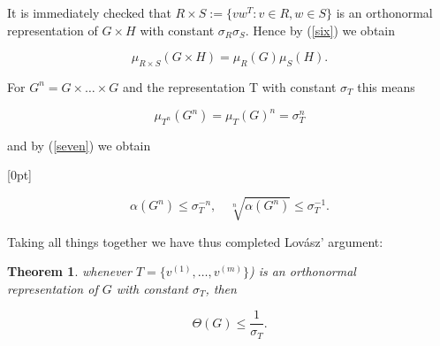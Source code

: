 \documentclass[openany,12pt]{memoir}
\newtheorem*{thm}{Theorem}                                                        %
\begin{document}
It is immediately checked that $R \times S := \{vw^T : v \in R, w \in S\}$ is an
orthonormal representation of $G \times H$ with constant $\sigma_R \sigma_S$. Hence by (\ref{six}) 
we obtain 

\[
\mu_{R \times S}(G \times H) = \mu_{R}(G)\mu_{S}(H).
\]

For $G^n = G \times \ldots \times G$ and the representation T with constant $\sigma_T$ this
means 

\[
\mu_{T^n}(G^n) = \mu_{T}(G)^n = \sigma_{T}^n
\]

and by (\ref{seven}) we obtain

[0pt]

\[
\alpha(G^n) \leq \sigma_{T}^{-n},  \quad   \sqrt[n]{\alpha(G^n)} \leq \sigma_{T}^{-1}.
\]

Taking all things together we have thus completed Lov\'asz' argument: 


\begin{thm}\label{theorem}
whenever $T = \{v^{(1)}, \ldots, v^{(m)}\}$) is an orthonormal\\ 
representation of $G$ with constant $\sigma_T$, then

\begin{equation}
    \Theta(G) \leq {\frac{1}{\sigma_T}}. \label{eight}
\end{equation}

\end{thm}
\end{document}

